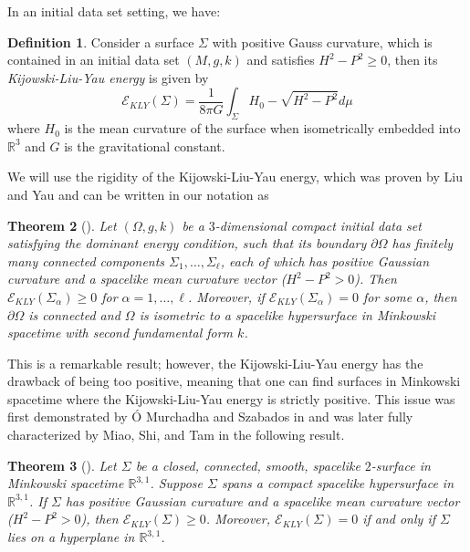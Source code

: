 \documentclass[12pt,a4paper]{amsart}
\theoremstyle{plain}
\newtheorem{theorem}{Theorem}[section]
\theoremstyle{definition}
\newtheorem{definition}[theorem]{Definition}
\begin{document}
In an initial data set setting, we have: 
 \begin{definition}
     Consider a surface $\Sigma$ with positive Gauss curvature, which is contained in an initial data set $(M,g, k)$ and satisfies $H^2 -P^2 \geq 0$, then its 
 \emph{Kijowski-Liu-Yau energy} is given by 
     $$\mathcal{E}_{KLY}(\Sigma)=\frac{1}{8 \pi G}\int_\Sigma  H_0- \sqrt{H^2-P^2} d\mu $$
     where $H_0$ is the mean curvature of the surface when isometrically embedded into $\mathbb{R}^3$ and $G$ is the gravitational  constant.
 \end{definition}
 We will use the rigidity of the Kijowski-Liu-Yau energy, which was proven by Liu and Yau and can be written in our notation as 
\begin{theorem}[{\cite[Theorem 1]{liu2003positivity, liu2006positivity}}] \label{liuyaurigi}
    Let \( (\Omega, g, k)\) be a $3$-dimensional compact initial data set satisfying the dominant energy condition, such that its boundary \(\partial \Omega\) has finitely many connected components \(\Sigma_1, \dots, \Sigma_\ell\), each of which has positive Gaussian curvature and a spacelike mean curvature vector ($H^2-P^2>0$).  Then \(\mathcal{E}_{KLY}(\Sigma_\alpha) \geq 0\) for \(\alpha = 1, \dots, \ell\). Moreover, if \(\mathcal{E}_{KLY}(\Sigma_\alpha) = 0\) for some \(\alpha\), then  \(\partial \Omega\) is connected and  $\Omega$ is isometric to a spacelike hypersurface in Minkowski
spacetime with second fundamental form  $k$.  
\end{theorem}
This is a remarkable result; however, the Kijowski-Liu-Yau energy has the drawback of being too positive, meaning that one can find surfaces in Minkowski spacetime where the Kijowski-Liu-Yau energy is strictly positive. This issue was first demonstrated by Ó Murchadha and Szabados in \cite{murchadha2004comment} and was later fully characterized by Miao, Shi, and Tam in the following result.
\begin{theorem}[{\cite[Theorem 4.1]{miao2010geometric}}]\label{minkowskirigi}
    Let \( \Sigma \) be a closed, connected, smooth, spacelike \( 2 \)-surface in Minkowski spacetime \( \mathbb{R}^{3,1} \). 
    Suppose \( \Sigma \) spans a compact spacelike hypersurface in \( \mathbb{R}^{3,1} \).
    If \( \Sigma \) has positive Gaussian curvature and a spacelike mean curvature vector ($H^2-P^2>0$), then $
    \mathcal{E}_{KLY} (\Sigma) \geq 0$.
    Moreover, \( \mathcal{E}_{KLY} (\Sigma) = 0 \) if and only if \( \Sigma \) lies on a hyperplane in \( \mathbb{R}^{3,1} \).
\end{theorem}
\end{document}
